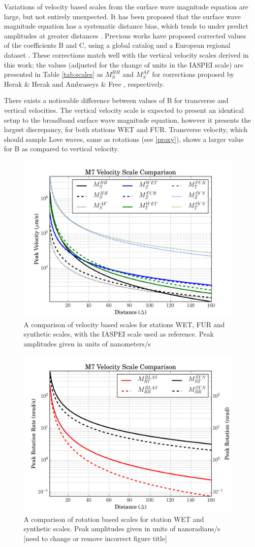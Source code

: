\documentclass{gji}
\begin{document}
Variations of velocity based scales from the surface wave magnitude equation are large, but not entirely unexpected. It has been proposed that the surface wave magnitude equation has a systematic distance bias, which tends to under predict amplitudes at greater distances \cite{herak1993distance}. Previous works have proposed corrected values of the coefficients B and C, using a global catalog \cite{herak1993distance} and a European regional dataset \cite{ambraseys1997surface}. These corrections match well with the vertical velocity scales derived in this work; the values (adjusted for the change of units in the IASPEI scale) are presented in Table \ref{tab:scales} as $M_S^{HH}$ and $M_S^{AF}$ for corrections proposed by Herak \& Herak  and Ambraseys \& Free , respectively. 

There exists a noticeable difference between values of B for transverse and vertical velocities. The vertical velocity scale is expected to present an identical setup to the broadband surface wave magnitude equation, however it presents the largest discrepancy, for both stations WET and FUR. Transverse velocity, which should sample Love waves, same as rotations (see \ref{proxy}), shows a larger value for B as compared to vertical velocity.

\begin{figure}
\centerline{\includegraphics[width=.5\textwidth]{velocityscales}}
\caption{A comparison of velocity based scales for stations WET, FUR and synthetic scales, with the IASPEI scale used as reference. Peak amplitudes given in units of nanometers/s}
\label{fig:vel_scale}
\end{figure}

\begin{figure}
\centerline{\includegraphics[width=.5\textwidth]{rrscales}}
\caption{A comparison of rotation based scales for station WET and synthetic scales. Peak amplitudes given in units of nanoradians/s [need to change or remove incorrect figure title]}
\label{fig:rr_scale}
\end{figure}
\end{document}
